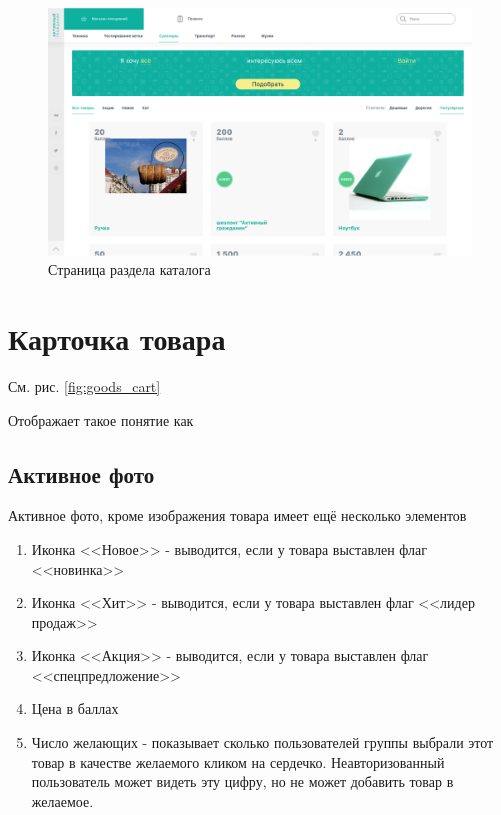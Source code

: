         
        \begin{figure}
            \includegraphics[width=170mm]{02_noauth_funcs/figures/06.eps}
            \caption{Страница раздела каталога}
            \label{fig:catalog_section}
        \end{figure} 
        


    \section{Карточка товара}
        \label{sec:goods_cart}
        См. рис. \ref{fig:goods_cart}
       
        Отображает такое понятие как 

        \subsection{Активное фото}
            \label{sec:noauth_active_photo}
            Активное фото, кроме изображения товара имеет ещё несколько элементов
            
            \begin{enumerate}
                \item Иконка <<Новое>> - выводится, если у товара выставлен 
                    флаг <<новинка>>
                \item Иконка <<Хит>> - выводится, если у товара выставлен 
                    флаг <<лидер продаж>>
                \item Иконка <<Акция>> - выводится, если у товара выставлен 
                    флаг <<спецпредложение>>
                \item Цена в баллах 
                \item Число желающих - показывает сколько пользователей группы 
                     выбрали этот товар в качестве 
                        желаемого 
                    кликом на сердечко. Неавторизованный пользователь может 
                        видеть
                    эту цифру, но не может добавить товар в желаемое.
            \end{enumerate}



